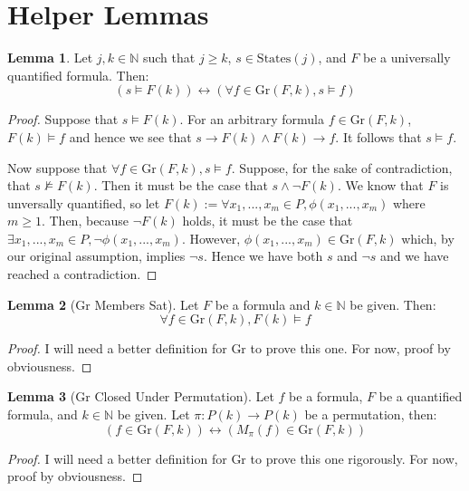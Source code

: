 \documentclass[12pt]{article}
\theoremstyle{definition}
\newtheorem{lemma}{Lemma}
\theoremstyle{remark}
\newcommand{\states}{\text{States}}
\newcommand{\gr}{\text{Gr}}
\begin{document}
\section{Helper Lemmas}

\begin{lemma}
  \label{lem:pnf-ground}
  Let $j,k \in \mathbb{N}$ such that $j \geq k$, $s \in \states(j)$, and $F$ be a universally quantified formula.  Then:
  $$(s \models F(k)) \leftrightarrow (\forall f \in \gr(F,k), s \models f)$$
\end{lemma}
\begin{proof}
  Suppose that $s \models F(k)$.  For an arbitrary formula $f \in \gr(F,k)$, $F(k) \models f$ and hence we see that $s \rightarrow F(k) \land F(k) \rightarrow f$.  It follows that $s \models f$.

  Now suppose that $\forall f \in \gr(F,k), s \models f$.  Suppose, for the sake of contradiction, that $s \not\models F(k)$.  Then it must be the case that $s \land \neg F(k)$.  We know that $F$ is unversally quantified, so let $F(k) := \forall x_1,...,x_m \in P, \phi(x_1,...,x_m)$ where $m \geq 1$.  Then, because $\neg F(k)$ holds, it must be the case that $\exists x_1,...,x_m \in P, \neg \phi(x_1,...,x_m)$.  However, $\phi(x_1,...,x_m) \in \gr(F,k)$ which, by our original assumption, implies $\neg s$.  Hence we have both $s$ and $\neg s$ and we have reached a contradiction.
\end{proof}

\begin{lemma}[Gr Members Sat]
  \label{lem:gr-sat}
  Let $F$ be a formula and $k \in \mathbb{N}$ be given.  Then:
  $$\forall f \in \gr(F,k), F(k) \models f$$
\end{lemma}
\begin{proof}
  I will need a better definition for $\gr$ to prove this one.  For now, proof by obviousness.
\end{proof}

\begin{lemma}[Gr Closed Under Permutation]
  \label{lem:gr-closed}
  Let $f$ be a formula, $F$ be a quantified formula, and $k \in \mathbb{N}$ be given.  Let $\pi : P(k) \to P(k)$ be a permutation, then:
  $$(f \in \gr(F,k)) \leftrightarrow (M_\pi(f) \in \gr(F,k))$$
\end{lemma}
\begin{proof}
  I will need a better definition for $\gr$ to prove this one rigorously.  For now, proof by obviousness.
\end{proof}
\end{document}
